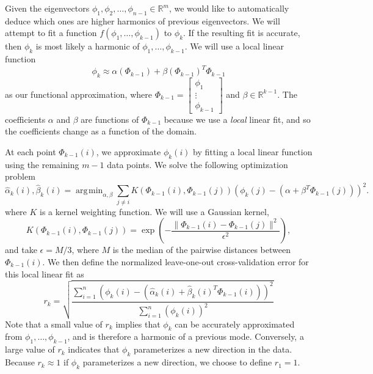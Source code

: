 \documentclass[preprint]{elsarticle}
\DeclareMathOperator*{\argmin}{\arg\!\min}
\begin{document}
Given the eigenvectors $\phi_1, \phi_2, \dots, \phi_{n-1} \in \mathbb{R}^m$, we would like to automatically deduce which ones are higher harmonics of previous eigenvectors. 
%
We will attempt to fit a function $f(\phi_1, \dots, \phi_{k-1})$ to $\phi_{k}$. 
%
If the resulting fit is accurate, then $\phi_{k}$ is most likely a harmonic of $\phi_1, \dots, \phi_{k-1}$. 
%
We will use a local linear function 
\begin{equation}
\phi_k \approx \alpha( \Phi_{k-1}) + \beta(\Phi_{k-1})^T \Phi_{k-1}
\end{equation}
%
as our functional approximation, where 
%
$\Phi_{k-1} = \begin{bmatrix} \phi_1 \\ \vdots \\ \phi_{k-1} \end{bmatrix}$
and $\beta \in \mathbb{R}^{k-1}$. 
%
The coefficients $\alpha$ and $\beta$ are functions of $\Phi_{k-1}$ because we use a {\em local} linear fit, and so the coefficients change as a function of the domain. 

At each point $\Phi_{k-1}(i)$, we approximate $\phi_k(i)$ by fitting a local linear function using the remaining $m-1$ data points. 
%
We solve the following optimization problem 
\begin{equation} \label{eq:opt_problem}
\hat{\alpha}_k (i) , \hat{\beta}_k(i)  = \argmin_{\alpha, \beta} \sum_{j \ne i} K(\Phi_{k-1}(i), \Phi_{k-1}(j)) \left( \phi_{k}(j) - (\alpha + \beta^T \Phi_{k-1}(j)) \right)^2.
\end{equation}
%
where $K$ is a kernel weighting function.
%
We will use a Gaussian kernel, 
%
\begin{equation}
K(\Phi_{k-1}(i), \Phi_{k-1}(j))  = \exp \left( - \frac{\|\Phi_{k-1}(i) - \Phi_{k-1} (j) \|^2}{\epsilon^2} \right),
\end{equation}
%
and take $\epsilon = M / 3$, where $M$ is the median of the pairwise distances between $\Phi_{k-1}(i)$.
%
We then define the normalized leave-one-out cross-validation error for this local linear fit as
\begin{equation} \label{eq:cv_error}
r_{k} = \sqrt{ \frac{\sum_{i=1}^n \left( \phi_{k} (i) - (\hat{\alpha}_k(i) + \hat{\beta}_k(i)^T \Phi_{k-1}(i))  \right)^2} {\sum_{i=1}^n  \left( \phi_{k} (i) \right)^2 }}
\end{equation}
%
Note that a small value of $r_k$ implies that $\phi_{k}$ can be accurately approximated from $\phi_1, \dots, \phi_{k-1}$, and is therefore a harmonic of a previous mode.
%
Conversely, a large value of $r_{k}$ indicates that $\phi_{k}$ parameterizes a new direction in the data.
%
Because $r_{k} \approx 1$ if $\phi_{k}$ parameterizes a new direction, we choose to define $r_1 = 1$.
\end{document}
